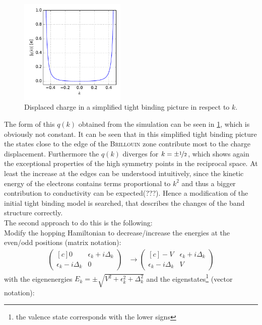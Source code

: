 \begin{figure}
	\centering
	\includegraphics[width = 0.45\textwidth]{Images/Hydrogen/charging/charge_vs_k}
	\caption{Displaced charge in a simplified tight binding picture in respect to $k$.}
	\label{image_tight_binding_q_vs_k}
\end{figure}
The form of this $q(k)$ obtained from the simulation can be seen in \cref{image_tight_binding_q_vs_k}, which is obviously not constant. It can be seen that in this simplified tight binding picture the states close to the edge of the \textsc{Brillouin} zone contribute most to the charge displacement. Furthermore the $q(k)$ diverges for $k = \pm \nicefrac{1}{2}$, which shows again the exceptional properties of the high symmetry points in the reciprocal space. At least the increase at the edges can be understood intuitively, since the kinetic energy of the electrons contains terms proportional to $k^2$ and thus a bigger contribution to conductivity can be expected(???). Hence a modification of the initial tight binding model is searched, that describes the changes of the band structure correctly.\\
The second approach to do this is the following:\\
Modify the hopping Hamiltonian to decrease/increase the energies at the even/odd positions (matrix notation):
\begin{align}
\begin{pmatrix*}[c]
0 & \epsilon_k + i \Delta_k \\
\epsilon_k - i \Delta_k & 0
\end{pmatrix*} 
&\to 
\begin{pmatrix*}[c]
-V & \epsilon_k + i \Delta_k \\
\epsilon_k - i \Delta_k & V
\end{pmatrix*}
\end{align}
with the eigenenergies $E_k = \pm \sqrt{V^2+\epsilon_k^2+\Delta_k^2}$ and the eigenstates\footnote{the valence state corresponds with the lower signs} (vector notation):
